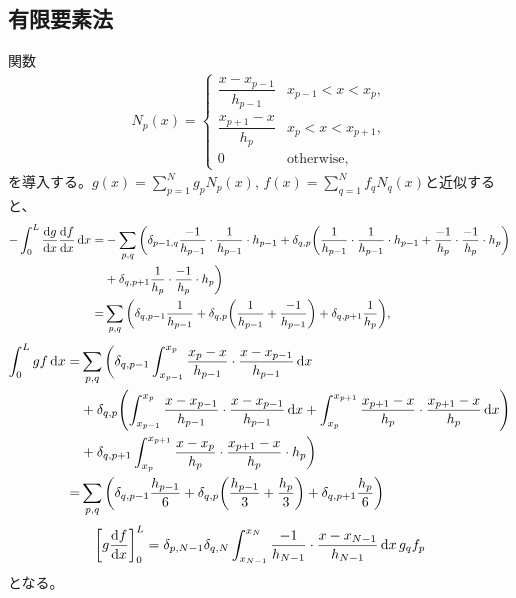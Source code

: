 \documentclass[xelatex,ja=standard]{bxjsarticle}
\begin{document}
\subsection{有限要素法}
関数
\begin{align}
    N_p(x) = 
    \begin{cases}
        \dfrac{x-x_{p-1}}{h_{p-1}}&x_{p-1}<x<x_p,\\
        \dfrac{x_{p+1} - x}{h_p}&x_{p}<x<x_{p+1},\\
        0&\text{otherwise},
    \end{cases}
\end{align}
を導入する。$g(x) = \sum_{p=1}^N g_pN_p(x)$, $f(x) = \sum_{q=1}^N f_qN_q(x)$と近似すると、
\begin{align}
    -\int_0^L \dv{g}{x}\dv{f}{x}\dd{x}
     =& -\sum_{p, q}\bigg(\delta_{p - 1, q}\dfrac{-1}{h_{p-1}}\cdot\dfrac{1}{h_{p-1}}\cdot h_{p-1}
      + \delta_{q, p}\qty(\dfrac{1}{h_{p-1}}\cdot\dfrac{1}{h_{p-1}}\cdot h_{p-1} + \dfrac{-1}{h_{p}}\cdot\dfrac{-1}{h_{p}}\cdot h_{p})\notag\\
      &+ \delta_{q, p + 1}\dfrac{1}{h_{p}}\cdot\dfrac{-1}{h_{p}}\cdot h_{p}
      \bigg)\notag\\
     =& \sum_{p, q}\bigg(\delta_{q, p - 1}\dfrac{1}{h_{p-1}}
      + \delta_{q, p}\qty(\dfrac{1}{h_{p-1}} + \dfrac{-1}{h_{p-1}})+ \delta_{q, p + 1}\dfrac{1}{h_{p}}
      \bigg),
\end{align}
\begin{align}
    \int_0^L gf\dd{x}
     =& \sum_{p, q}\bigg(\delta_{q, p - 1}\int_{x_{p-1}}^{x_p}\dfrac{x_{p} - x}{h_{p-1}}\cdot\dfrac{x-x_{p-1}}{h_{p-1}}\dd{x}\notag\\
      &+ \delta_{q, p}\qty(\int_{x_{p-1}}^{x_p}\dfrac{x-x_{p-1}}{h_{p-1}}\cdot\dfrac{x-x_{p-1}}{h_{p-1}}\dd{x}
       + \int_{x_{p}}^{x_{p+1}}\dfrac{x_{p+1} - x}{h_{p}}\cdot\dfrac{x_{p+1} - x}{h_{p}}\dd{x})\notag\\
      &+ \delta_{q, p + 1}\int_{x_{p}}^{x_{p+1}}\dfrac{x-x_{p}}{h_{p}}\cdot\dfrac{x_{p+1} -x}{h_{p}}\cdot h_{p}
      \bigg)\notag\\
      =& \sum_{p, q}\bigg(\delta_{q, p - 1}\dfrac{h_{p-1}}{6}
      + \delta_{q, p}\qty(\dfrac{h_{p-1}}{3} + \dfrac{h_{p}}{3})+ \delta_{q, p + 1}\dfrac{h_{p}}{6}\bigg)
\end{align}
\begin{align}
    \qty[g\dv{f}{x}]_0^L
    = \delta_{p, N-1}\delta_{q, N}\int_{x_{N-1}}^{x_N}\dfrac{-1}{h_{N-1}}\cdot\dfrac{x-x_{N-1}}{h_{N-1}}\dd{x}g_q f_p
\end{align}
となる。
\end{document}
